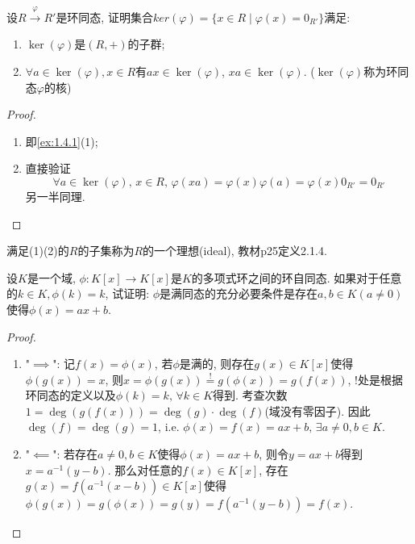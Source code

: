 \begin{problem}
    设$R \overset{\varphi}\to R'$是环同态, 证明集合$ker(\varphi) = \{x \in R \mid \varphi(x) = 0_{R'}\}$满足:
    \begin{enumerate}[(1)]
        \item $\ker(\varphi)$是$(R, +)$的子群;
        \item $\forall a \in \ker (\varphi), x \in R$有$ax \in \ker(\varphi)$, $xa \in \ker (\varphi)$. ($\ker(\varphi)$称为环同态$\varphi$的核)
    \end{enumerate}
\end{problem}

\begin{proof}
    \begin{enumerate}[(1)]
        \item 即\ref{ex:1.4.1}(1);
        \item 直接验证
        \[
            \forall a \in \ker(\varphi),\, x \in R,\, \varphi(xa) = \varphi(x)\varphi(a) = \varphi(x)0_{R'} = 0_{R'}
        \]
        另一半同理.
    \end{enumerate}
\end{proof}

\begin{remark}
    满足(1)(2)的$R$的子集称为$R$的一个理想(ideal), 教材p25定义2.1.4.
\end{remark}

\begin{problem}
    设$K$是一个域, $\phi:K[x] \to K[x]$是$K$的多项式环之间的环自同态. 如果对于任意的$k \in K, \phi(k) = k$, 试证明: $\phi$是满同态的充分必要条件是存在$a, b \in K(a \neq 0)$使得$\phi(x) = ax + b$.
\end{problem}

\begin{proof}
    \begin{enumerate}[(1)]
        \item "$\implies$": 记$f(x) = \phi(x)$, 若$\phi$是满的, 则存在$g(x) \in K[x]$使得$\phi(g(x)) = x$, 则$x = \phi(g(x)) \overset{!}= g(\phi(x)) = g(f(x))$, !处是根据环同态的定义以及$\phi(k) = k,\, \forall k \in K$得到. 考查次数$1 = \deg(g(f(x))) = \deg(g) \cdot \deg(f)$(域没有零因子). 因此$\deg(f) = \deg(g) = 1$, i.e. $\phi(x) = f(x) = ax + b,\, \exists a \neq 0, b \in K$.
        \item "$\impliedby$": 若存在$a \neq 0, b \in K$使得$\phi(x) = ax + b$, 则令$y = ax + b$得到$x = a^{-1}(y - b)$. 那么对任意的$f(x) \in K[x]$, 存在$g(x) = f(a^{-1}(x - b)) \in K[x]$使得$\phi(g(x)) = g(\phi(x)) = g(y) = f(a^{-1}(y - b)) = f(x)$.
    \end{enumerate}
\end{proof}

